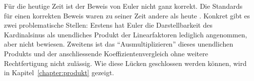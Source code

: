 Für die heutige Zeit ist der Beweis von Euler nicht ganz korrekt.
Die Standards für einen korrekten Beweis waren zu seiner Zeit andere als heute \cite{basel:YouTube}.
Konkret gibt es zwei problematische Stellen:
Erstens hat Euler die Darstellbarkeit des Kardinalsinus als unendliches Produkt der Linearfaktoren lediglich angenommen, 
aber nicht bewiesen.
Zweitens ist das ``Ausmultiplizieren'' dieses unendlichen Produkts und der anschliessende Koeffizientenvergleich
ohne weitere Rechtfertigung nicht zulässig.
Wie diese Lücken geschlossen werden können, wird in Kapitel~\ref{chapter:produkt} gezeigt.
